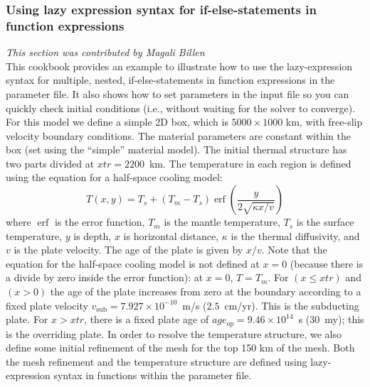\documentclass{article}
\DeclareMathOperator{\erf}{erf}
\begin{document}
\subsubsection{Using lazy expression syntax for if-else-statements in function expressions}
\label{sec:lazy-expression}
\textit{This section was contributed by Magali Billen}\\
This cookbook provides an example to illustrate how to use the lazy-expression syntax for multiple, nested, if-else-statements in function expressions in the parameter file. It also shows how to set parameters in the input file so you can quickly check initial conditions (i.e., without waiting for the solver to converge).  For this model we define a simple 2D box, which is $5000 \times 1000$ km, with free-slip velocity boundary conditions. The material parameters are constant within the box (set using the  ``simple'' material model). The initial thermal structure has two parts divided at $xtr=2200$~km. The temperature in each region is defined using the equation for a half-space cooling model:
\begin{equation}
T(x,y) = T_s + (T_m  - T_s) \erf{(\frac{y}{2\sqrt{\kappa x/v}})}
\end{equation}
where $\erf$ is the error function, $T_m$ is the mantle temperature, $T_s$ is the surface temperature, $y$ is depth, $x$ is horizontal distance, $\kappa$ is the thermal diffusivity, and $v$ is the plate velocity. The age of the plate is given by $x/v$. Note that the equation for the half-space cooling model is not defined at $x=0$ (because there is a divide by zero inside the error function): at $x=0$, $T=T_m$.  For $(x \le xtr)$ and $(x>0)$ the age of the plate increases from zero at the boundary according to a fixed plate velocity $v_\text{sub}=7.927\times10^{-10}$~m/s  ($2.5$~cm/yr). This is the subducting plate. For $x > xtr$, there is a fixed plate age of $age_{op}=9.46\times10^{14}$~s ($30$~my); this is the overriding plate. In order to resolve the temperature structure, we also define some initial refinement of the mesh for the top 150 km of the mesh. Both the mesh refinement and the temperature structure are defined using lazy-expression syntax in functions within the parameter file.
\end{document}
